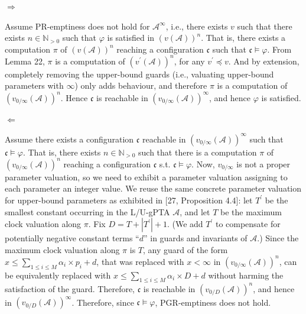 
  $\Rightarrow$  
 
Assume PR-emptiness does not hold for ${\mathcal{A}}^{\infty}$, i.e., there exists $v$ such that there exists $n\in\mathbb{N}_{>0}$ such that $\varphi$ is satisfied in ${(v(\mathcal{A}))}^{n}$. That is, there exists a computation $\pi$ of ${(v(\mathcal{A}))}^{n}$ reaching a configuration $\mathfrak{c}$ such that $\mathfrak{c}\models\varphi$. From Lemma 22, $\pi$ is a computation of ${(v^{\prime}(\mathcal{A}))}^{n}$, for any $v^{\prime}\preceq v$. And by extension, completely removing the upper-bound guards (i.e., valuating upper-bound parameters with $\infty$) only adds behaviour, and therefore $\pi$ is a computation of ${(v_{0/\infty}(\mathcal{A}))}^{n}$. Hence $\mathfrak{c}$ is reachable in ${(v_{0/\infty}(\mathcal{A}))}^{\infty}$, and hence $\varphi$ is satisfied.\par
 
  $\Leftarrow$  
 
Assume there exists a configuration $\mathfrak{c}$ reachable in ${(v_{0/\infty}(\mathcal{A}))}^{\infty}$ such that $\mathfrak{c}\models\varphi$. That is, there exists $n\in\mathbb{N}_{>0}$ such that there is a computation $\pi$ of ${(v_{0/\infty}(\mathcal{A}))}^{n}$ reaching a configuration $\mathfrak{c}$ s.t. $\mathfrak{c}\models\varphi$. Now, $v_{0/\infty}$ is not a proper parameter valuation, so we need to exhibit a parameter valuation assigning to each parameter an integer value. We reuse the same concrete parameter valuation for upper-bound parameters as exhibited in [27, Proposition 4.4]: let $T^{\prime}$ be the smallest constant occurring in the L/U-gPTA $\mathcal{A}$, and let $T$ be the maximum clock valuation along $\pi$. Fix $D=T+|T^{\prime}|+1$. (We add $T^{\prime}$ to compensate for potentially negative constant terms “$d$” in guards and invariants of $\mathcal{A}$.) Since the maximum clock valuation along $\pi$ is $T$, any guard of the form $x\leq\sum_{1\leq i\leq M}\alpha_{i}\times p_{i}+d$, that was replaced with $x<\infty$ in ${(v_{0/\infty}(\mathcal{A}))}^{n}$, can be equivalently replaced with $x\leq\sum_{1\leq i\leq M}\alpha_{i}\times D+d$ without harming the satisfaction of the guard. Therefore, $\mathfrak{c}$ is reachable in ${(v_{0/D}(\mathcal{A}))}^{n}$, and hence in ${(v_{0/D}(\mathcal{A}))}^{\infty}$. Therefore, since $\mathfrak{c}\models\varphi$, PGR-emptiness does not hold.\par
 
